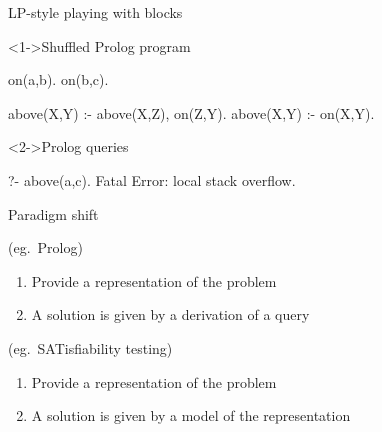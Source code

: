 \begin{frame}[fragile]{LP-style playing with blocks}
  \begin{block}<1->{Shuffled Prolog program}%
    \small\vspace{-2ex}%
\begin{semiverbatim}
on(a,b).
on(b,c).

above(X,Y) :- above(X,Z), on(Z,Y).
above(X,Y) :- on(X,Y).
\end{semiverbatim}
    \vspace{-1ex}%
  \end{block}
  \begin{block}<2->{Prolog queries\phantom{)}}%
    \small\vspace{-2ex}%
\begin{semiverbatim}
?- above(a,c).
\pause[3]
Fatal Error: local stack overflow.
\end{semiverbatim}
    \vspace{-1ex}%
  \end{block}
\end{frame}
\begin{frame}{Paradigm shift}
  \bigskip

  \begin{description}

  \item<1>[Theorem Proving based approach] (eg.\ Prolog)
    \begin{enumerate}
    \item Provide a representation of the problem

    \item A solution is given by a \alert{derivation} of a query
    \end{enumerate}
    \bigskip

  \item<1-2>[Model Generation based approach] (eg.\ SATisfiability testing)
    \begin{enumerate}
    \item Provide a representation of the problem

    \item A solution is given by a \alert{model} of the representation
    \end{enumerate}
  \end{description}
\end{frame}
